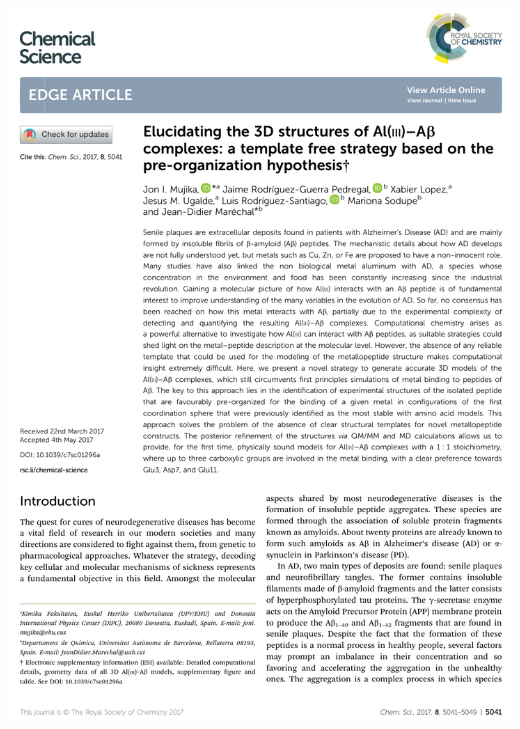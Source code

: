 \includegraphics[width=\textwidth]{figures/pubs/alum.pdf}
\clearpage\thispagestyle{empty}\mbox{}\clearpage
